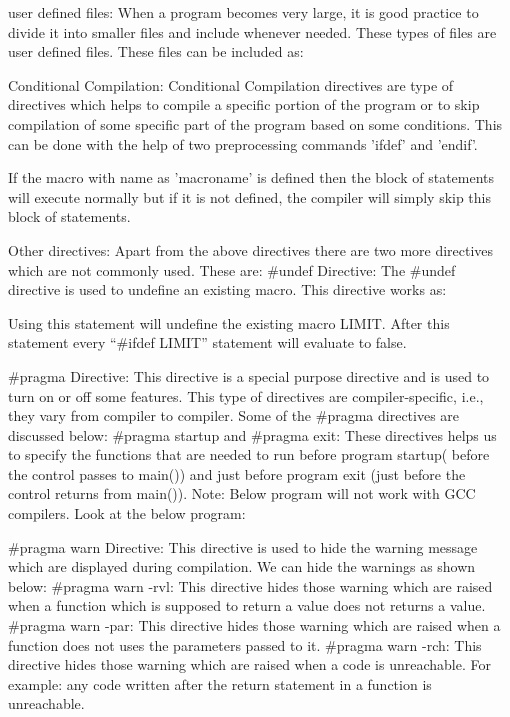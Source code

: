 \documentclass[12pt, a4paper]{article}
\begin{document}
        user defined files: When a program becomes very large, it is good practice to divide it into smaller files and include whenever needed. These types of files are user defined files. These files can be included as:


    Conditional Compilation: Conditional Compilation directives are type of directives which helps to compile a specific portion of the program or to skip compilation of some specific part of the program based on some conditions. This can be done with the help of two preprocessing commands 'ifdef' and 'endif'. 

    If the macro with name as 'macroname' is defined then the block of statements will execute normally but if it is not defined, the compiler will simply skip this block of statements. 

    Other directives: Apart from the above directives there are two more directives which are not commonly used. These are: 
    \#undef Directive: The \#undef directive is used to undefine an existing macro. This directive works as:

    Using this statement will undefine the existing macro LIMIT. After this statement every “\#ifdef LIMIT” statement will evaluate to false. 

    \#pragma Directive: This directive is a special purpose directive and is used to turn on or off some features. This type of directives are compiler-specific, i.e., they vary from compiler to compiler. Some of the \#pragma directives are discussed below: 
    \#pragma startup and \#pragma exit: These directives helps us to specify the functions that are needed to run before program startup( before the control passes to main()) and just before program exit (just before the control returns from main()). 
    Note: Below program will not work with GCC compilers. 
    Look at the below program:


    \#pragma warn Directive: This directive is used to hide the warning message which are displayed during compilation. 
    We can hide the warnings as shown below: 
    \#pragma warn -rvl: This directive hides those warning which are raised when a function which is supposed to return a value does not returns a value.
    \#pragma warn -par: This directive hides those warning which are raised when a function does not uses the parameters passed to it.
    \#pragma warn -rch: This directive hides those warning which are raised when a code is unreachable. For example: any code written after the return statement in a function is unreachable.
\end{document}
